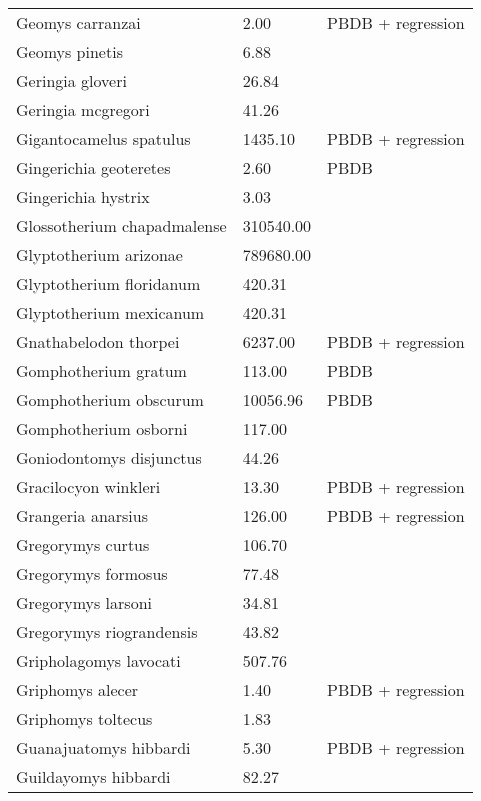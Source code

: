 \begin{longtable}{p{} p{} p{}}
    Geomys carranzai & 2.00 & PBDB + regression \\ 
    Geomys pinetis & 6.88 & \cite{Smith2004} \\ 
    Geringia gloveri & 26.84 & \cite{Tomiya2013} \\ 
    Geringia mcgregori & 41.26 & \cite{Tomiya2013} \\ 
    Gigantocamelus spatulus & 1435.10 & PBDB + regression \\ 
    Gingerichia geoteretes & 2.60 & PBDB \\ 
    Gingerichia hystrix & 3.03 & \cite{Bjork1970} \\ 
    Glossotherium chapadmalense & 310540.00 & \cite{McDonald1995} \\ 
    Glyptotherium arizonae & 789680.00 & \cite{McDonald1995} \\ 
    Glyptotherium floridanum & 420.31 & \cite{Smith2004} \\ 
    Glyptotherium mexicanum & 420.31 & \cite{Smith2004} \\ 
    Gnathabelodon thorpei & 6237.00 & PBDB + regression \\ 
    Gomphotherium gratum & 113.00 & PBDB \\ 
    Gomphotherium obscurum & 10056.96 & PBDB \\ 
    Gomphotherium osborni & 117.00 & \cite{Wang2014} \\ 
    Goniodontomys disjunctus & 44.26 & \cite{Tomiya2013} \\ 
    Gracilocyon winkleri & 13.30 & PBDB + regression \\ 
    Grangeria anarsius & 126.00 & PBDB + regression \\ 
    Gregorymys curtus & 106.70 & \cite{Tomiya2013} \\ 
    Gregorymys formosus & 77.48 & \cite{Tomiya2013} \\ 
    Gregorymys larsoni & 34.81 & \cite{Tomiya2013} \\ 
    Gregorymys riograndensis & 43.82 & \cite{Tomiya2013} \\ 
    Gripholagomys lavocati & 507.76 & \cite{Tomiya2013} \\ 
    Griphomys alecer & 1.40 & PBDB + regression \\ 
    Griphomys toltecus & 1.83 & \cite{Mihlbacher2006} \\ 
    Guanajuatomys hibbardi & 5.30 & PBDB + regression \\ 
    Guildayomys hibbardi & 82.27 & \cite{Tomiya2013} \\ 

\end{longtable}
